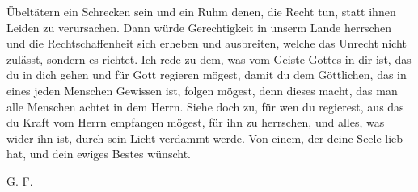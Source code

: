 {    Übeltätern ein Schrecken sein und ein Ruhm denen, 
    die Recht tun, statt
    ihnen Leiden zu verursachen. Dann würde Gerechtigkeit in unserm
    Lande herrschen und die Rechtschaffenheit sich erheben und 
    ausbreiten, welche das Unrecht nicht zulässt, sondern es richtet. 
    Ich
    rede zu dem, was vom Geiste Gottes in dir ist, das du in dich
    gehen und für Gott regieren mögest, damit du dem Göttlichen,
    das in eines jeden Menschen Gewissen 
    ist, folgen mögest, denn
    dieses macht, das man alle Menschen achtet in dem Herrn. Siehe
    doch zu, für wen du regierest, aus das du Kraft vom Herrn
    empfangen mögest, für ihn zu herrschen, und alles, was wider ihn
    ist, durch sein Licht verdammt werde.
    Von einem, der deine Seele lieb hat, und dein ewiges Bestes
    wünscht.

    \bigskip

    \begin{flushright}G. F.\end{flushright}

}
